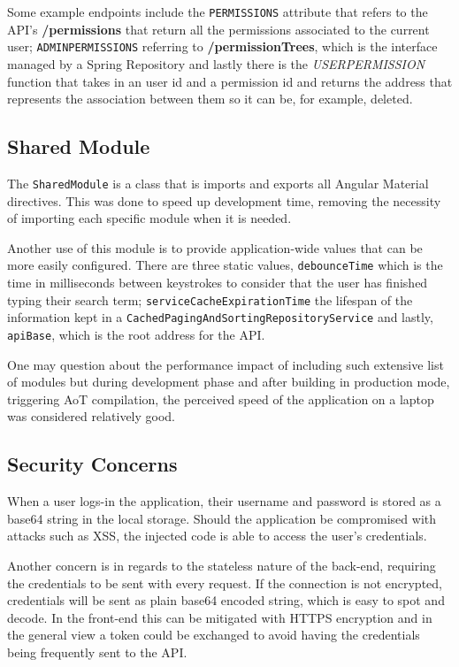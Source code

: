 Some example endpoints include the \texttt{PERMISSIONS} attribute that refers to the \gls{API}'s \textbf{/permissions} that return all the permissions associated to the current user; \texttt{ADMIN\textunderscore PERMISSIONS} referring to \textbf{/permissionTrees}, which is the interface managed by a Spring Repository and lastly there is the \textit{USER\textunderscore PERMISSION} function that takes in an user id and a permission id and returns the address that represents the association between them so it can be, for example, deleted.

\subsection{Shared Module}
The \texttt{SharedModule} is a class that is imports and exports all Angular Material directives. This was done to speed up development time, removing the necessity of importing each specific module when it is needed.

Another use of this module is to provide application-wide values that can be more easily configured. There are three static values, \texttt{debounceTime} which is the time in milliseconds between keystrokes to consider that the user has finished typing their search term; \texttt{serviceCacheExpirationTime} the lifespan of the information kept in a \texttt{CachedPagingAndSortingRepositoryService} and lastly, \texttt{apiBase}, which is the root address for the \gls{API}.

One may question about the performance impact of including such extensive list of modules but during development phase and after building in production mode, triggering \gls{AoT} compilation, the perceived speed of the application on a laptop was considered relatively good.


\subsection{Security Concerns}

When a user logs-in the application, their username and password is stored as a base64 string in the local storage. Should the application be compromised with attacks such as \gls{XSS}, the injected code is able to access the user's credentials.

Another concern is in regards to the stateless nature of the back-end, requiring the credentials to be sent with every request. If the connection is not encrypted, credentials will be sent as plain base64 encoded string, which is easy to spot and decode. In the front-end this can be mitigated with \gls{HTTPS} encryption and in the general view a token could be exchanged to avoid having the credentials being frequently sent to the \gls{API}.

